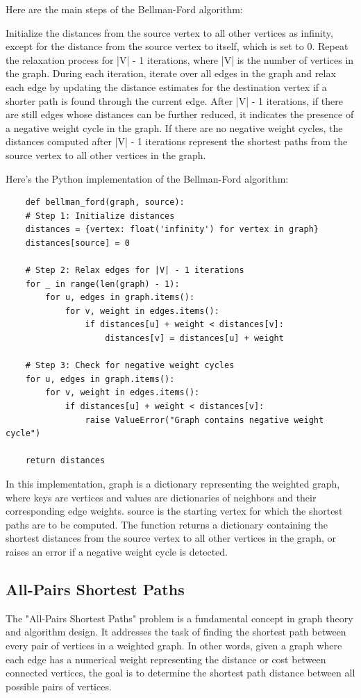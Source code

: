 \documentclass[12pt]{book} %
\begin{document}
Here are the main steps of the Bellman-Ford algorithm:

Initialize the distances from the source vertex to all other vertices as infinity, except for the distance from the source vertex to itself, which is set to 0.
Repeat the relaxation process for |V| - 1 iterations, where |V| is the number of vertices in the graph.
During each iteration, iterate over all edges in the graph and relax each edge by updating the distance estimates for the destination vertex if a shorter path is found through the current edge.
After |V| - 1 iterations, if there are still edges whose distances can be further reduced, it indicates the presence of a negative weight cycle in the graph.
If there are no negative weight cycles, the distances computed after |V| - 1 iterations represent the shortest paths from the source vertex to all other vertices in the graph.

Here's the Python implementation of the Bellman-Ford algorithm:
\FloatBarrier
\begin{lstlisting}
    def bellman_ford(graph, source):
    # Step 1: Initialize distances
    distances = {vertex: float('infinity') for vertex in graph}
    distances[source] = 0
    
    # Step 2: Relax edges for |V| - 1 iterations
    for _ in range(len(graph) - 1):
        for u, edges in graph.items():
            for v, weight in edges.items():
                if distances[u] + weight < distances[v]:
                    distances[v] = distances[u] + weight
    
    # Step 3: Check for negative weight cycles
    for u, edges in graph.items():
        for v, weight in edges.items():
            if distances[u] + weight < distances[v]:
                raise ValueError("Graph contains negative weight cycle")
    
    return distances
\end{lstlisting}
\FloatBarrier
In this implementation, graph is a dictionary representing the weighted graph, where keys are vertices and values are dictionaries of neighbors and their corresponding edge weights. source is the starting vertex for which the shortest paths are to be computed. The function returns a dictionary containing the shortest distances from the source vertex to all other vertices in the graph, or raises an error if a negative weight cycle is detected.
\subsection{All-Pairs Shortest Paths}
The "All-Pairs Shortest Paths" problem is a fundamental concept in graph theory and algorithm design. It addresses the task of finding the shortest path between every pair of vertices in a weighted graph. In other words, given a graph where each edge has a numerical weight representing the distance or cost between connected vertices, the goal is to determine the shortest path distance between all possible pairs of vertices.
\end{document}
